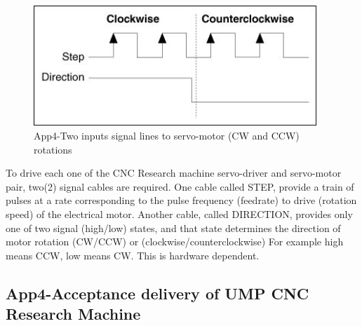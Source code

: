 \begin{figure}[htbp]
	\begin{center}
		\includegraphics[width=0.95\textwidth]{./07-images/img-Ch4App/two-inputs-motor-signals-pulse-and-direction-CW-and-CCW.jpg}
		\caption{App4-Two inputs signal lines to servo-motor (CW and CCW) rotations}
		\label{fig:App4-two-inputs-motor-signals-pulse-and-direction-CW-and-CCW.jpg}
	\end{center}
\end{figure}
To drive each one of the CNC Research machine servo-driver and servo-motor pair, two(2) signal cables are required. One cable called STEP, provide a train of pulses at a rate corresponding to the pulse frequency (feedrate) to drive (rotation speed) of the electrical motor. Another cable, called DIRECTION, provides only one of two signal (high/low) states, and that state determines the direction of motor rotation (CW/CCW) or (clockwise/counterclockwise) For example high means CCW, low means CW. This is hardware dependent. 

\pagebreak
\subsection{App4-Acceptance delivery of UMP CNC Research Machine}

